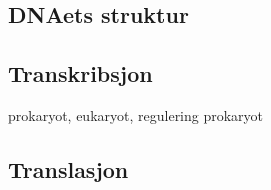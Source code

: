 \subsection{DNAets struktur}

\subsection{Transkribsjon}
    prokaryot, eukaryot, regulering prokaryot

\subsection{Translasjon}
